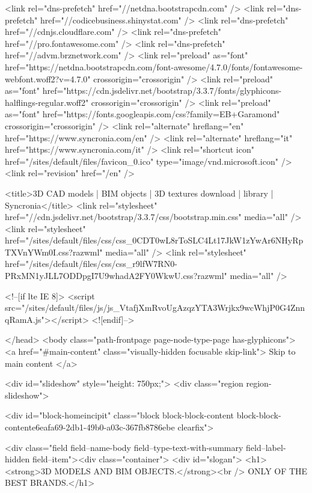 <link rel="dns-prefetch" href="//netdna.bootstrapcdn.com" />
<link rel="dns-prefetch" href="//codicebusiness.shinystat.com" />
<link rel="dns-prefetch" href="//cdnjs.cloudflare.com" />
<link rel="dns-prefetch" href="//pro.fontawesome.com" />
<link rel="dns-prefetch" href="//advm.brznetwork.com" />
<link rel="preload" as="font" href="https://netdna.bootstrapcdn.com/font-awesome/4.7.0/fonts/fontawesome-webfont.woff2?v=4.7.0" crossorigin="crossorigin" />
<link rel="preload" as="font" href="https://cdn.jsdelivr.net/bootstrap/3.3.7/fonts/glyphicons-halflings-regular.woff2" crossorigin="crossorigin" />
<link rel="preload" as="font" href="https://fonts.googleapis.com/css?family=EB+Garamond" crossorigin="crossorigin" />
<link rel="alternate" hreflang="en" href="https://www.syncronia.com/en" />
<link rel="alternate" hreflang="it" href="https://www.syncronia.com/it" />
<link rel="shortcut icon" href="/sites/default/files/favicon_0.ico" type="image/vnd.microsoft.icon" />
<link rel="revision" href="/en" />

    <title>3D CAD models | BIM objects | 3D textures download | library | Syncronia</title>
    <link rel="stylesheet" href="//cdn.jsdelivr.net/bootstrap/3.3.7/css/bootstrap.min.css" media="all" />
<link rel="stylesheet" href="/sites/default/files/css/css_0CDT0wL8rToSLC4Lt17JkW1zYwAr6NHyRpTXVnYWm0I.css?razwml" media="all" />
<link rel="stylesheet" href="/sites/default/files/css/css_r9lfW7RN0-PRxMN1yJLL7ODDpgI7U9whadA2FY0WkwU.css?razwml" media="all" />

    
<!--[if lte IE 8]>
<script src="/sites/default/files/js/js_VtafjXmRvoUgAzqzYTA3Wrjkx9wcWhjP0G4ZnnqRamA.js"></script>
<![endif]-->

  </head>
  <body class="path-frontpage page-node-type-page has-glyphicons">
    <a href="#main-content" class="visually-hidden focusable skip-link">
      Skip to main content
    </a>

    

    
    



      <div id="slideshow" style="height: 750px;">
        <div class="region region-slideshow">
    
<div id="block-homeincipit" class="block block-block-content block-block-contente6eafa69-2db1-49b0-a03c-367fb8786ebe clearfix">
  
    

      
            <div class="field field--name-body field--type-text-with-summary field--label-hidden field--item"><div class="container">
<div id="slogan">
<h1><strong>3D MODELS AND BIM OBJECTS.</strong><br />
ONLY OF THE BEST BRANDS.</h1>

